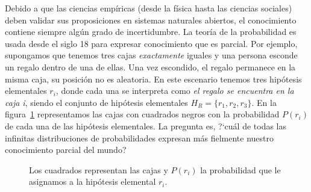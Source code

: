 \documentclass[a4paper,11pt]{book}
\theoremstyle{definition}
\begin{document}
Debido a que las ciencias emp\'iricas (desde la f\'isica hasta las ciencias sociales) deben validar sus proposiciones en sistemas naturales abiertos, el conocimiento contiene siempre alg\'un grado de incertidumbre.
%
La teor\'ia de la probabilidad es usada desde el siglo 18 para expresar conocimiento que es parcial.
%
Por ejemplo, supongamos que tenemos tres cajas \emph{exactamente} iguales y una persona esconde un regalo dentro de una de ellas.
%
Una vez escondido, el regalo permanece en la misma caja, su posici\'on no es aleatoria.
%
En este escenario tenemos tres hip\'otesis elementales $r_i$, donde cada una se interpreta como \emph{el regalo se encuentra en la caja i}, siendo el conjunto de hip\'otesis elementales $H_R = \{r_1, r_2, r_3\}$.
%
En la figura~\ref{eq:campo_de_probabilidades_regalo} representamos las cajas con cuadrados negros con la probabilidad $P(r_i)$ de cada una de las hip\'otesis elementales.
%
La pregunta es, ?`cu\'al de todas las infinitas distribuciones de probabilidades expresan m\'as fielmente nuestro conocimiento parcial del mundo?
%
\begin{figure}[ht!]
\centering
\begin{subfigure}[b]{0.32\textwidth}
 \centering
\end{subfigure}
    \caption{Los cuadrados representan las cajas y $P(r_i)$ la probabilidad que le asignamos a la hip\'otesis elemental $r_i$.}
    \label{eq:campo_de_probabilidades_regalo}
\end{figure}

\end{document}
